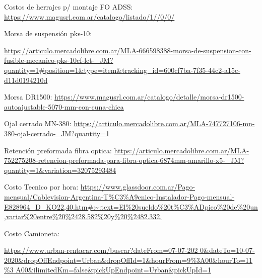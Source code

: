 %




\begin{thebibliography}{99}




Costos de herrajes p/ montaje FO ADSS: \url{https://www.magusrl.com.ar/catalogo/listado/1//0/0/}

Morsa de suspensión pks-10: \begin{tiny}
\url{https://articulo.mercadolibre.com.ar/MLA-666598388-morsa-de-suspension-con-fusible-mecanico-pks-10cf-lct-_JM?quantity=1#position=1&type=item&tracking_id=600cf7ba-7f35-44c2-a15c-d11d0194210d
}
\end{tiny}

Morsa DR1500: \url{https://www.magusrl.com.ar/catalogo/detalle/morsa-dr1500-autoajustable-5070-mm-con-cuna-chica
}

Ojal cerrado MN-380: \url{https://articulo.mercadolibre.com.ar/MLA-747727106-mn-380-ojal-cerrado-_JM?quantity=1
}

Retención preformada fibra optica: \url{https://articulo.mercadolibre.com.ar/MLA-752275208-retencion-preformada-para-fibra-optica-6874mm-amarillo-x5-_JM?quantity=1&variation=32075293484}

 Costo Tecnico por hora: 
{\tiny \url{https://www.glassdoor.com.ar/Pago-mensual/Cablevision-Argentina-T\%C3\%A9cnico-Instalador-Pago-mensual-E828964_D_KO22,40.htm#:~:text=El\%20sueldo\%20t\%C3\%ADpico\%20de\%20un,variar\%20entre\%20\%2428.582\%20y\%20\%2482.332.}}


 Costo Camioneta: 
\begin{tiny}
\url{https://www.urban-rentacar.com/buscar?dateFrom=07-07-202
0&dateTo=10-07-2020&dropOffEndpoint=Urban&dropOffId=1&hourFrom=9%
A00&ilimitedKm=false&pickUpEndpoint=Urban&pickUpId=1}
\end{tiny}








\end{thebibliography}


\newpage

